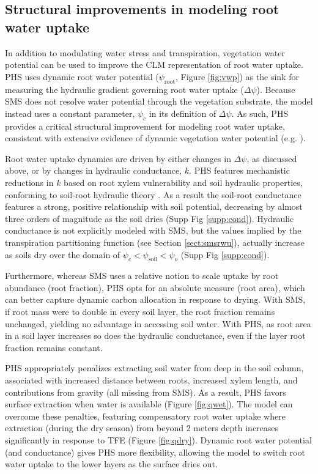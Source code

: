\documentclass[draft,linenumbers]{agujournal}
\begin{document}
\subsection{Structural improvements in modeling root water uptake}
    In addition to modulating water stress and transpiration, vegetation water potential can be used to improve the CLM representation of root water uptake.
PHS uses dynamic root water potential ($\psi_{\text{root}}$, Figure \ref{fig:vwp}) as the sink for measuring the hydraulic gradient governing root water uptake ($\Delta\psi$).
Because SMS does not resolve water potential through the vegetation substrate, the model instead uses a constant parameter, $\psi_c$ in its definition of $\Delta\psi$.
    As such, PHS provides a critical structural improvement for modeling root water uptake, consistent with extensive evidence of dynamic vegetation water potential (e.g. \cite{fisher2006}).

    Root water uptake dynamics are driven by either changes in $\Delta\psi$, as discussed above, or by changes in hydraulic conductance, $k$. 
    PHS features mechanistic reductions in $k$ based on root xylem vulnerability and soil hydraulic properties, 
    conforming to soil-root hydraulic theory \citep{cai2014,warren2015}.
    As a result the soil-root conductance features a strong, positive relationship with soil potential, decreasing by almost three orders of magnitude as the soil dries (Supp Fig \ref{supp:cond}).
    Hydraulic conductance is not explicitly modeled with SMS, but the values implied by the transpiration partitioning function (see Section \ref{sect:smsrwu}), actually increase as soils dry over the domain of $\psi_c<\psi_{\text{soil}}<\psi_o$ (Supp Fig \ref{supp:cond}).
    
        Furthermore, whereas SMS uses a relative notion to scale uptake by root abundance (root fraction), PHS opts for an absolute measure (root area), which can better capture dynamic carbon allocation in response to drying.
    With SMS, if root mass were to double in every soil layer, the root fraction remains unchanged, yielding no advantage in accessing soil water.
    With PHS, as root area in a soil layer increases so does the hydraulic conductance, even if the layer root fraction remains constant.
    
    PHS appropriately penalizes extracting soil water from deep in the soil column, associated with increased distance between roots, increased xylem length, and contributions from gravity (all missing from SMS).
    As a result, PHS favors surface extraction when water is available (Figure \ref{fig:qwet}).
    The model can overcome these penalties, featuring compensatory root water uptake where extraction (during the dry season) from beyond 2 meters depth increases significantly in response to TFE (Figure \ref{fig:qdry}).
    Dynamic root water potential (and conductance) gives PHS more flexibility, allowing the model to switch root water uptake to the lower layers as the surface dries out.
   
\end{document}
